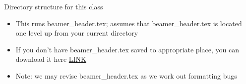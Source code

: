 \documentclass[
  8pt,
  ignorenonframetext,
  dvipsnames]{beamer}
\providecommand{\tightlist}{%
  \setlength{\itemsep}{0pt}\setlength{\parskip}{0pt}}
\let\olditem\item
\renewcommand{\item}{%
  \olditem\vspace{4pt}
}
\begin{document}
\begin{frame}[fragile]{Directory structure for this class}
\begin{itemize}
\tightlist
\item
  This runs beamer\_header.tex; assumes that beamer\_header.tex is
  located one level up from your current directory
\item
  If you don't have beamer\_header.tex saved to appropriate place, you
  can download it here
  \href{https://github.com/anyone-can-cook/rclass1/blob/master/lectures/beamer_header.tex}{LINK}
\item
  Note: we may revise beamer\_header.tex as we work out formatting bugs
\end{itemize}
\end{frame}
\end{document}
